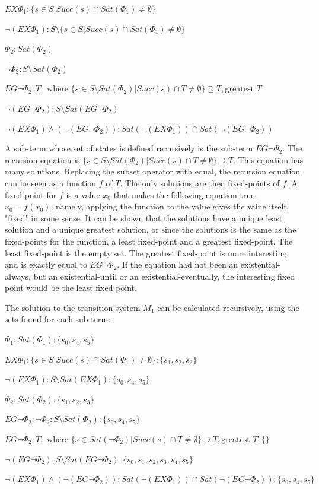 $EX \Phi_1: \{s \in S | Succ(s) \cap Sat(\Phi_1) \neq \emptyset\}$

$\neg (EX \Phi_1): S \setminus \{s \in S | Succ(s) \cap Sat(\Phi_1) \neq \emptyset\}$

$\Phi_2: Sat(\Phi_2)$

$\neg \Phi_2: S \setminus Sat(\Phi_2)$

$EG \neg \Phi_2: T, \text{    where } \{s \in S \setminus Sat(\Phi_2) | Succ(s) \cap T \neq \emptyset \} \supseteq T, \text{greatest } T$

$\neg (EG \neg \Phi_2): S \setminus Sat(EG \neg \Phi_2)$

$\neg (EX \Phi_1) \wedge (\neg (EG \neg \Phi_2)): Sat(\neg (EX \Phi_1)) \cap Sat(\neg (EG \neg \Phi_2))$

A sub-term whose set of states is defined recursively is the sub-term $EG \neg \Phi_2$.
The recursion equation is $\{s \in S \setminus Sat(\Phi_2) | Succ(s) \cap T \neq \emptyset \} \supseteq T$.
This equation has many solutions.
Replacing the subset operator with equal, the recursion equation can be seen as a function $f$ of $T$.
The only solutions are then fixed-points of $f$.
A fixed-point for $f$ is a value $x_0$ that makes the following equation true: $x_0 = f(x_0)$,
namely, applying the function to the value gives the value itself, "fixed" in some sense.
It can be shown that the solutions have a unique least solution and a unique greatest solution,
or since the solutions is the same as the fixed-points for the function, a least fixed-point and a greatest fixed-point.
The least fixed-point is the empty set.
The greatest fixed-point is more interesting, and is exactly equal to $EG \neg \Phi_2$.
If the equation had not been an existential-always, but an existential-until or
an existential-eventually, the interesting fixed point would be the least fixed point.

The solution to the transition system $M_1$ can be calculated recursively,
using the sets found for each sub-term:

$\Phi_1: Sat(\Phi_1): \{s_0, s_4, s_5\}$

$EX \Phi_1: \{s \in S | Succ(s) \cap Sat(\Phi_1) \neq \emptyset\}: \{s_1, s_2, s_3\}$

$\neg (EX \Phi_1): S \setminus Sat(EX \Phi_1): \{s_0, s_4, s_5\}$

$\Phi_2: Sat(\Phi_2): \{s_1, s_2, s_3\}$

$EG \neg \Phi_2: \neg \Phi_2: S \setminus Sat(\Phi_2): \{s_0, s_4, s_5\}$

$EG \neg \Phi_2: T, \text{    where } \{s \in Sat(\neg \Phi_2) | Succ(s) \cap T \neq \emptyset \} \supseteq T, \text{greatest } T: \{\}$

$\neg (EG \neg \Phi_2): S \setminus Sat(EG \neg \Phi_2): \{s_0, s_1, s_2, s_3, s_4, s_5\}$

$\neg (EX \Phi_1) \wedge (\neg (EG \neg \Phi_2)): Sat(\neg (EX \Phi_1)) \cap Sat(\neg (EG \neg \Phi_2)): \{s_0, s_4, s_5\}$


